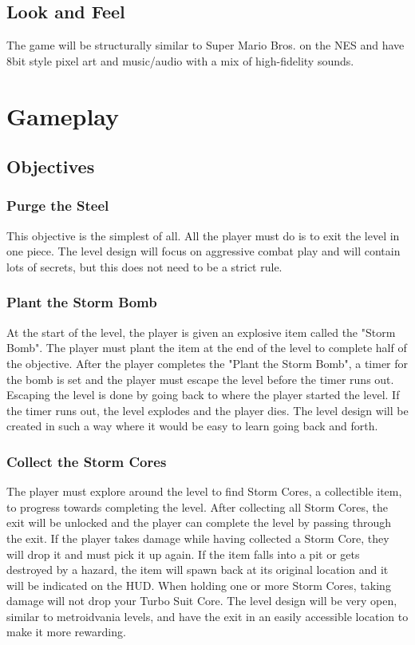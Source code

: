 \documentclass[12pt]{article}
\begin{document}
\subsection{Look and Feel}

The game will be structurally similar to Super Mario Bros. on the NES and have 8bit style pixel art and music/audio with a mix of high-fidelity sounds. 

\section{Gameplay}

\subsection{Objectives}

\subsubsection{Purge the Steel}

This objective is the simplest of all. All the player must do is to exit the level in one piece. The level design will focus on aggressive combat play and will contain lots of secrets, but this does not need to be a strict rule. 

\subsubsection{Plant the Storm Bomb}

At the start of the level, the player is given an explosive item called the "Storm Bomb". The player must plant the item at the end of the level to complete half of the objective. After the player completes the "Plant the Storm Bomb", a timer for the bomb is set and the player must escape the level before the timer runs out. Escaping the level is done by going back to where the player started the level. If the timer runs out, the level explodes and the player dies. The level design will be created in such a way where it would be easy to learn going back and forth.

\subsubsection{Collect the Storm Cores}

The player must explore around the level to find Storm Cores, a collectible item, to progress towards completing the level. After collecting all Storm Cores, the exit will be unlocked and the player can complete the level by passing through the exit. If the player takes damage while having collected a Storm Core, they will drop it and must pick it up again. If the item falls into a pit or gets destroyed by a hazard, the item will spawn back at its original location and it will be indicated on the HUD. When holding one or more Storm Cores, taking damage will not drop your Turbo Suit Core. The level design will be very open, similar to metroidvania levels, and have the exit in an easily accessible location to make it more rewarding. 
\end{document}
